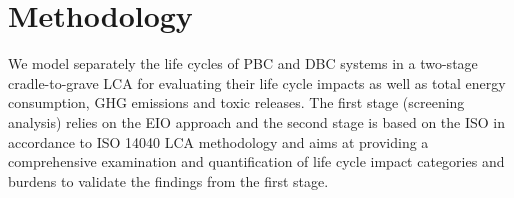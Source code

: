 \documentclass[3p,times,procedia]{elsarticle}
\begin{document}

\section{Methodology}

We model separately the life cycles of PBC and DBC systems in a two-stage cradle-to-grave LCA for evaluating their life cycle impacts as well as total energy consumption, GHG emissions and toxic releases. The first stage (screening analysis) relies on the EIO approach and the second stage is based on the ISO in accordance to ISO 14040 LCA methodology and aims at providing a comprehensive examination and quantification of life cycle impact categories and burdens to validate the findings from the first stage.
\end{document}
